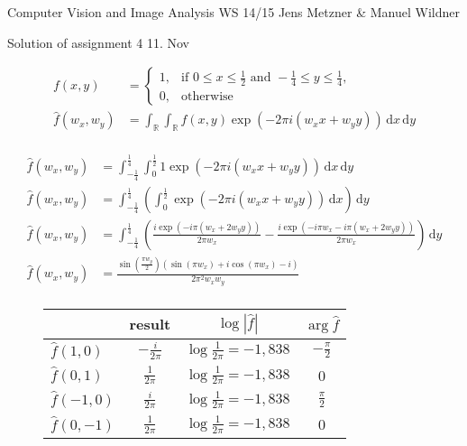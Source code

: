 \documentclass[10pt,a4paper]{scrartcl}
\newcommand{\R}{\mathbb{R}}
\newcommand{\der}{\,\mathrm{d}}
\begin{document}
\uebkopfzeile
  {Computer Vision and Image Analysis} %
  {WS 14/15}  %
  {}    %
  {Jens Metzner \& Manuel Wildner}    %

\uebtitel
{Solution of assignment 4} %
{11. Nov} %



\begin{align*}
f(x,y) &= \left\{\begin{array}{cl} 1, & \mbox{if }0 \leq x \leq \frac{1}{2} \mbox{ and } -\frac{1}{4} \leq y \leq \frac{1}{4},\\ 0, & \mbox{otherwise} \end{array}\right.\\
%
\hat f(w_x,w_y) &= \int_\R \int_\R f(x,y) \exp{\left(-2\pi i(w_xx+w_yy)\right)}\der x \der y\\
\end{align*}

\begin{align*}
\hat f(w_x,w_y) &= \int_{-\frac{1}{4}}^\frac{1}{4} \int_0^\frac{1}{2} 1 \exp{\left(-2\pi i(w_xx+w_yy)\right)}\der x \der y\\
%
\hat f(w_x,w_y) &= \int_{-\frac{1}{4}}^\frac{1}{4} \left(\int_0^\frac{1}{2} \exp{\left(-2\pi i(w_xx+w_yy)\right)}\der x \right)\der y\\
%
\hat f(w_x,w_y) &= \int_{-\frac{1}{4}}^\frac{1}{4} \left(\frac{i\exp{\left(-i\pi (w_x+2w_yy)\right)}}{2\pi w_x} - \frac{i\exp{\left(-i\pi w_x-i\pi(w_x+2w_yy)\right)}}{2\pi w_x}\right)\der y\\
%
\hat f(w_x,w_y) &= \frac{\sin{\left(\frac{\pi w_y}{2}\right)} \left(\sin{(\pi w_x)} + i \cos{(\pi w_x)} - i\right)}{2 \pi^2 w_x w_y}\\
\end{align*}
\begin{figure}[h]
\center
\renewcommand\arraystretch{1.5}%
\begin{tabular}{l|ccc}
 & result & $\log|\hat f|$ & $\arg{\hat f}$\\\hline
$\hat f(1,0)$ & $-\frac{i}{2\pi}$ & $\log\frac{1}{2\pi} = -1,838$ & $-\frac{\pi}{2}$ \\
$\hat f(0,1)$ & $\frac{1}{2\pi}$ & $\log\frac{1}{2\pi} = -1,838$ & 0 \\
$\hat f(-1,0)$ & $\frac{i}{2\pi}$ & $\log\frac{1}{2\pi} = -1,838$ & $\frac{\pi}{2}$ \\
$\hat f(0,-1)$ & $\frac{1}{2\pi}$ & $\log\frac{1}{2\pi} = -1,838$ & 0 \\
\end{tabular}
\end{figure}
\end{document}
